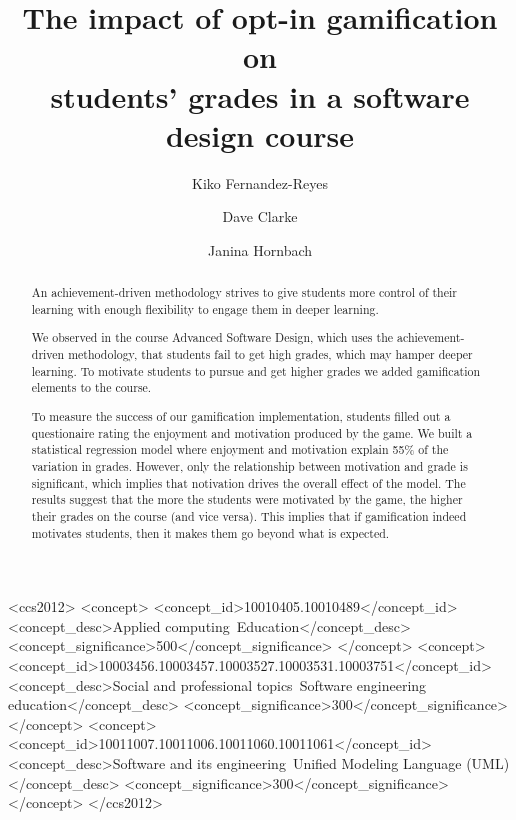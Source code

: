 \documentclass[sigconf]{acmart}
\begin{document}
\title{The impact of opt-in gamification on \\ students' grades in a
software design course}
\author{Kiko Fernandez-Reyes}
\author{Dave Clarke}
\author{Janina Hornbach}
\date{}

\begin{abstract}
An achievement-driven methodology strives to give students more control
of their learning with enough flexibility to engage them in deeper
learning.

We observed in the course Advanced Software Design, which uses the
achievement-driven methodology, that students fail to get high grades,
which may hamper deeper learning. To motivate students to pursue and get
higher grades we added gamification elements to the course.

To measure the success of our gamification implementation, students
filled out a questionaire rating the enjoyment and motivation produced
by the game. We built a statistical regression model where enjoyment and
motivation explain 55\% of the variation in grades. However, only the
relationship between motivation and grade is significant, which implies
that notivation drives the overall effect of the model. The results
suggest that the more the students were motivated by the game, the
higher their grades on the course (and vice versa). This implies that if
gamification indeed motivates students, then it makes them go beyond
what is expected.
\end{abstract}


\begin{CCSXML}
<ccs2012>
<concept>
<concept_id>10010405.10010489</concept_id>
<concept_desc>Applied computing~Education</concept_desc>
<concept_significance>500</concept_significance>
</concept>
<concept>
<concept_id>10003456.10003457.10003527.10003531.10003751</concept_id>
<concept_desc>Social and professional topics~Software engineering education</concept_desc>
<concept_significance>300</concept_significance>
</concept>
<concept>
<concept_id>10011007.10011006.10011060.10011061</concept_id>
<concept_desc>Software and its engineering~Unified Modeling Language (UML)</concept_desc>
<concept_significance>300</concept_significance>
</concept>
</ccs2012>
\end{CCSXML}
\end{document}
